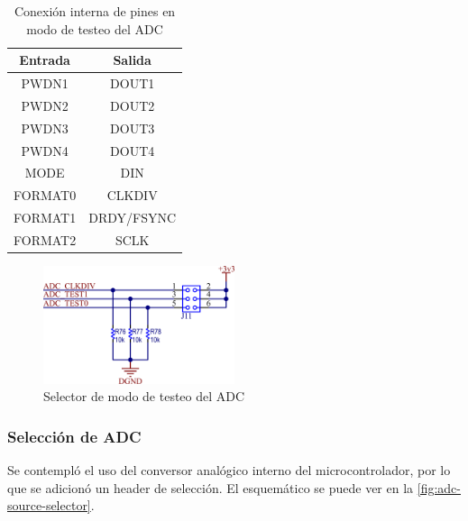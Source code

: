\documentclass[../et.tex]{subfiles}
\begin{document}
\begin{table}[!htbp]
  \centering
  \begin{tabular}{|c|c|}
    \hline
    \textbf{Entrada}                 & \textbf{Salida}                 \\ \hline
    PWDN1                            & DOUT1                           \\ \hline
    PWDN2                            & DOUT2                           \\ \hline
    PWDN3                            & DOUT3                           \\ \hline
    PWDN4                            & DOUT4                           \\ \hline
    MODE                             & DIN                             \\ \hline
    FORMAT0                          & CLKDIV                          \\ \hline
    FORMAT1                          & DRDY/FSYNC                      \\ \hline
    FORMAT2                          & SCLK                            \\ \hline
  \end{tabular}
  \caption{Conexión interna de pines en modo de testeo del ADC}
  \label{tab:adc-test-pins}
\end{table}

\begin{figure}[!htbp]
  \centering
  \includegraphics[width=0.5\textwidth]{../images/adc-test-selector.png}
  \caption{Selector de modo de testeo del ADC}
  \label{fig:adc-test-selector}
\end{figure}

\subsubsection{Selección de ADC}
Se contempló el uso del conversor analógico interno del microcontrolador, por lo que se adicionó un header de selección. El esquemático se puede ver en la \autoref{fig:adc-source-selector}.
\end{document}
